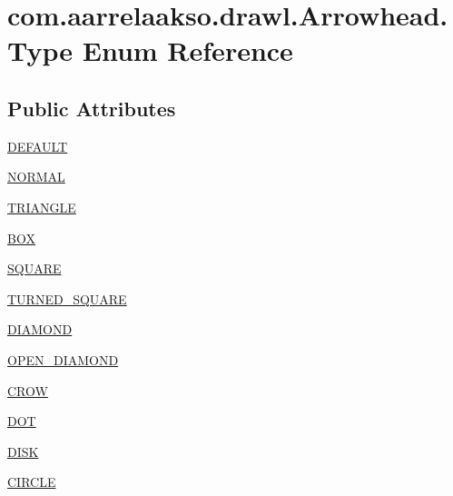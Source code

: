 \hypertarget{enumcom_1_1aarrelaakso_1_1drawl_1_1_arrowhead_1_1_type}{}\section{com.\+aarrelaakso.\+drawl.\+Arrowhead.\+Type Enum Reference}
\label{enumcom_1_1aarrelaakso_1_1drawl_1_1_arrowhead_1_1_type}
\subsection*{Public Attributes}
\begin{DoxyCompactItemize}
\item 
\hyperlink{enumcom_1_1aarrelaakso_1_1drawl_1_1_arrowhead_1_1_type_ae4c70d3cd0853637fba791f2bb29cd8e}{D\+E\+F\+A\+U\+LT}
\item 
\hyperlink{enumcom_1_1aarrelaakso_1_1drawl_1_1_arrowhead_1_1_type_abd0879a22002109b53e3d6af939c0734}{N\+O\+R\+M\+AL}
\item 
\hyperlink{enumcom_1_1aarrelaakso_1_1drawl_1_1_arrowhead_1_1_type_a84bfc9a808825452b04017d73f63f99e}{T\+R\+I\+A\+N\+G\+LE}
\item 
\hyperlink{enumcom_1_1aarrelaakso_1_1drawl_1_1_arrowhead_1_1_type_a823c7c75a5a70ecf72ee123eb4bec04f}{B\+OX}
\item 
\hyperlink{enumcom_1_1aarrelaakso_1_1drawl_1_1_arrowhead_1_1_type_a39ad0ea537ea80479c845425c4643abf}{S\+Q\+U\+A\+RE}
\item 
\hyperlink{enumcom_1_1aarrelaakso_1_1drawl_1_1_arrowhead_1_1_type_a463ab7af648a68ee790781ab09c04b49}{T\+U\+R\+N\+E\+D\+\_\+\+S\+Q\+U\+A\+RE}
\item 
\hyperlink{enumcom_1_1aarrelaakso_1_1drawl_1_1_arrowhead_1_1_type_a038817b0bde4231adfc55dd4f507df5c}{D\+I\+A\+M\+O\+ND}
\item 
\hyperlink{enumcom_1_1aarrelaakso_1_1drawl_1_1_arrowhead_1_1_type_a7bedad9291c6683881dbcdfdc4370035}{O\+P\+E\+N\+\_\+\+D\+I\+A\+M\+O\+ND}
\item 
\hyperlink{enumcom_1_1aarrelaakso_1_1drawl_1_1_arrowhead_1_1_type_af2ade96c668c81e82484da17f28ccf13}{C\+R\+OW}
\item 
\hyperlink{enumcom_1_1aarrelaakso_1_1drawl_1_1_arrowhead_1_1_type_ad1e2ede480af8de60271d06f2eeff6ca}{D\+OT}
\item 
\hyperlink{enumcom_1_1aarrelaakso_1_1drawl_1_1_arrowhead_1_1_type_a474091c67ecdac839f2402301a46dc5d}{D\+I\+SK}
\item 
\hyperlink{enumcom_1_1aarrelaakso_1_1drawl_1_1_arrowhead_1_1_type_aa798da36e5c99f20a9becce5adc4a8bd}{C\+I\+R\+C\+LE}

\end{DoxyCompactItemize}
